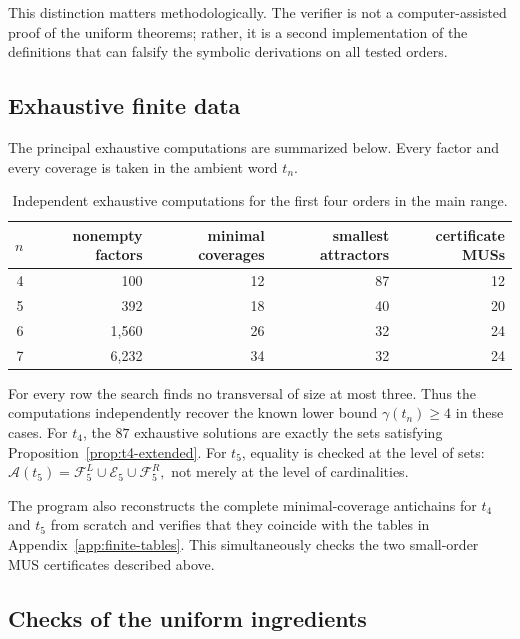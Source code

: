 \documentclass[11pt,a4paper]{article}
\theoremstyle{definition}\newtheorem{definition}[theorem]{Definition}
\theoremstyle{remark}\newtheorem{remark}[theorem]{Remark}
\newcommand{\Acal}{\mathcal{A}}
\newcommand{\FL}{\mathcal{F}^{L}}
\newcommand{\FR}{\mathcal{F}^{R}}
\begin{document}
This distinction matters methodologically.  The verifier is not a computer-assisted proof of the uniform theorems; rather, it is a second implementation of the definitions that can falsify the symbolic derivations on all tested orders.

\subsection{Exhaustive finite data}
\label{subsec:verification-data}

The principal exhaustive computations are summarized below.  Every factor and every coverage is taken in the ambient word $t_n$.

\begin{table}[ht]
\centering
\caption{Independent exhaustive computations for the first four orders in the main range.}
\label{tab:independent-computations}
\begin{tabular}{rrrrr}
\toprule
$n$ & nonempty factors & minimal coverages & smallest attractors & certificate MUSs\\
\midrule
4 & 100   & 12 & 87 & 12\\
5 & 392   & 18 & 40 & 20\\
6 & 1,560 & 26 & 32 & 24\\
7 & 6,232 & 34 & 32 & 24\\
\bottomrule
\end{tabular}
\end{table}

For every row the search finds no transversal of size at most three.  Thus the computations independently recover the known lower bound $\gamma(t_n)\ge4$ in these cases.  For $t_4$, the $87$ exhaustive solutions are exactly the sets satisfying Proposition~\ref{prop:t4-extended}.  For $t_5$, equality is checked at the level of sets:
$
 \Acal(t_5)=\FL_5\cup\mathcal E_5\cup\FR_5,
$
not merely at the level of cardinalities.

The program also reconstructs the complete minimal-coverage antichains for $t_4$ and $t_5$ from scratch and verifies that they coincide with the tables in Appendix~\ref{app:finite-tables}.  This simultaneously checks the two small-order MUS certificates described above.

\subsection{Checks of the uniform ingredients}
\label{subsec:uniform-checks}
\end{document}
